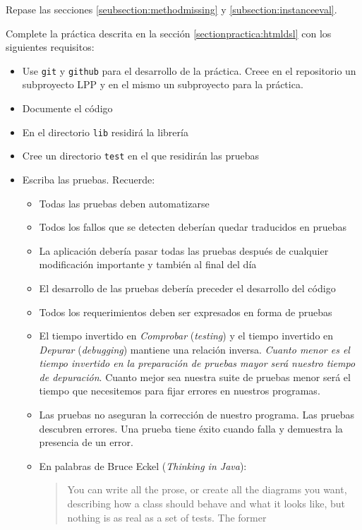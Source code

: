 Repase las secciones 
\ref{seubsection:methodmissing}
y
\ref{subsection:instanceeval}.

\label{sectionpracica:gitandrake}
Complete la práctica descrita en la sección
\ref{sectionpractica:htmldsl} con los siguientes requisitos:
\begin{itemize}
\item Use \verb|git| y \verb|github| para el desarrollo de la práctica. Creee 
en el repositorio un subproyecto LPP
y en el mismo un subproyecto para la práctica.
\item Documente el código
\item En el directorio \verb|lib| residirá la librería
\item Cree un directorio \verb|test| en el que residirán las pruebas
\item Escriba las pruebas. Recuerde:
  \begin{itemize}
  \item
  Todas las pruebas deben automatizarse
  \item
  Todos los fallos que se detecten deberían quedar traducidos en pruebas
  \item
  La aplicación debería pasar todas las pruebas después de cualquier modificación
  importante y también al final del día
  \item
  El desarrollo de las pruebas debería preceder el desarrollo 
  del código
  \item
  Todos los requerimientos deben ser expresados en forma de pruebas
  \item
  El tiempo invertido en \emph{Comprobar} (\emph{testing}) y el
  tiempo invertido en \emph{Depurar} (\emph{debugging})
  mantiene una relación inversa.  \emph{Cuanto menor es el tiempo invertido
  en la preparación de pruebas mayor será nuestro tiempo de depuración}.
  Cuanto mejor sea nuestra suite de pruebas menor será el tiempo que necesitemos
  para fijar errores en nuestros programas.
  \item
  Las pruebas no aseguran la corrección de nuestro programa.
  Las pruebas descubren errores. Una prueba tiene éxito cuando falla y
  demuestra la presencia de un error.
  \item
  En palabras de Bruce Eckel (\emph{Thinking in Java}):
  \begin{it}
  \begin{quote}
  You can write all the prose, or create
  all the diagrams you want, describing how a class should behave and what it looks
  like, but nothing is as real as a set of tests. The former

\end{quote}
\end{it}
\end{itemize}
\end{itemize}
